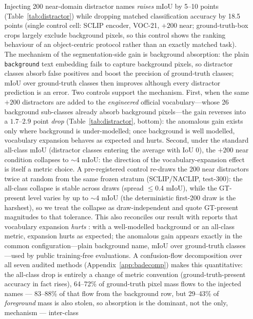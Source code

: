 \documentclass[11pt]{article}
\newcommand{\miou}{mIoU}
\begin{document}
Injecting 200 near-domain distractor names \emph{raises} \miou{} by 5--10 points
(Table~\ref{tab:distractor}) while dropping matched classification accuracy by 18.5
points (single control cell: SCLIP encoder, VOC-21, $+200$ near; ground-truth-box
crops largely exclude background pixels, so this control shows the ranking behaviour
of an object-centric protocol rather than an exactly matched task). The mechanism of
the segmentation-side gain is background absorption: the plain \texttt{background} text
embedding fails to capture background pixels, so distractor classes absorb false
positives and boost the precision of ground-truth classes; \miou{} over ground-truth
classes then improves although every distractor prediction is an error. Two controls
support the mechanism. First, when the same $+200$ distractors are added to the
\emph{engineered} official vocabulary---whose 26 background sub-classes already absorb
background pixels---the gain reverses into a $1.7$--$2.9$ point \emph{drop}
(Table~\ref{tab:distractor}, bottom): the anomalous gain exists only where background
is under-modelled; once background is well modelled, vocabulary expansion behaves as
expected and hurts. Second, under the standard all-class \miou{}
(distractor classes entering the average with IoU $0$), the $+200$ near condition
collapses to $\sim$4 \miou{}: the direction of the vocabulary-expansion effect is
itself a metric choice. A pre-registered control re-draws the 200 near
distractors twice at random from the same frozen stratum (SCLIP/NACLIP,
test-300): the all-class collapse is stable across draws (spread
$\le$0.4 \miou{}), while the GT-present level varies by up to $\sim$4 \miou{}
(the deterministic first-200 draw is the harshest), so we treat the collapse as
draw-independent and quote GT-present magnitudes to that tolerance. This also reconciles our result with reports that vocabulary
expansion \emph{hurts} \citep{huang2025revisit}: with a well-modelled background or an
all-class metric, expansion hurts as expected; the anomalous gain appears exactly in
the common configuration---plain background name, \miou{} over ground-truth
classes---used by public training-free evaluations. A confusion-flow
decomposition over all seven audited methods (Appendix~\ref{app:badecomp})
makes this quantitative: the all-class drop is entirely a change of metric
convention (ground-truth-present accuracy in fact rises), 64--72\% of
ground-truth pixel mass flows to the injected names --- 83--88\% of that flow
from the background row, but 29--43\% of \emph{foreground} mass is also
stolen, so absorption is the dominant, not the only, mechanism --- inter-class
\end{document}
